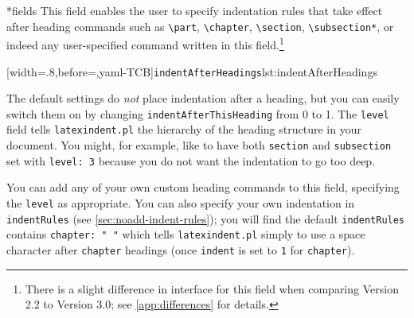 \documentclass[10pt]{article}
\begin{document}
*{fields}
 This field enables the user to specify indentation rules that take effect after heading
 commands such as \lstinline!\part!, \lstinline!\chapter!, \lstinline!\section!,
 \lstinline!\subsection*!, or indeed any user-specified command written in this
 field.\footnote{There is a slight difference in interface for this field when comparing
 Version 2.2 to Version 3.0; see \vref{app:differences} for details.}

 [width=.8\linewidth,before=\centering,yaml-TCB]{\texttt{indentAfterHeadings}}{lst:indentAfterHeadings}

 The default settings do \emph{not} place indentation after a heading, but you can easily
 switch them on by changing \texttt{indentAfterThisHeading} from 0 to 1. The
 \texttt{level} field tells \texttt{latexindent.pl} the hierarchy of the heading
 structure in your document. You might, for example, like to have both \texttt{section}
 and \texttt{subsection} set with \texttt{level: 3} because you do not want the
 indentation to go too deep.

 You can add any of your own custom heading commands to this field, specifying the
 \texttt{level} as appropriate. You can also specify your own indentation in
 \texttt{indentRules} (see \vref{sec:noadd-indent-rules}); you will find the default
 \texttt{indentRules} contains \lstinline!chapter: " "! which tells
 \texttt{latexindent.pl} simply to use a space character after \texttt{chapter} headings
 (once \texttt{indent} is set to \texttt{1} for \texttt{chapter}).
\end{document}

